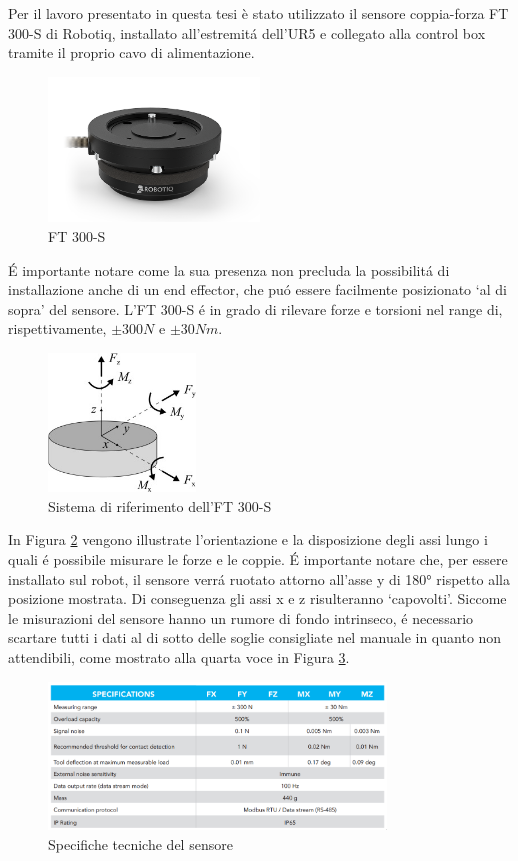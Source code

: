 Per il lavoro presentato in questa tesi è stato utilizzato il sensore coppia-forza FT 300-S di Robotiq, installato all'estremit\'{a} 
dell'UR5 e collegato alla control box tramite il proprio cavo di alimentazione. 
\begin{figure}[H]
    \centering
    \includegraphics*[width=0.5\textwidth]{images/ft.png}
    \caption{FT 300-S}
    \label{fig:ft}
\end{figure}
\'{E} importante notare come la sua presenza non precluda la possibilit\'{a} di installazione anche di un end effector, 
che pu\'{o} essere facilmente posizionato `al di sopra' del sensore. 
L'FT 300-S \'{e} in grado di rilevare forze e torsioni nel range di, rispettivamente, $\pm 300 N$ e $\pm 30 Nm$. 
\begin{figure}[H]
    \centering
    \includegraphics*[width=0.35\textwidth]{images/ft_axes.jpg}
    \caption{Sistema di riferimento dell'FT 300-S}
    \label{fig:ft_axes}
\end{figure}
In Figura \ref{fig:ft_axes} vengono illustrate l'orientazione e la disposizione degli assi lungo i quali \'{e} possibile misurare le 
forze e le coppie. \'{E} importante notare che, per essere installato sul robot, il sensore verr\'{a} ruotato attorno all'asse y di 180° 
rispetto alla posizione mostrata. Di conseguenza gli assi x e z risulteranno `capovolti'.
Siccome le misurazioni del sensore hanno un rumore di fondo intrinseco, \'{e} necessario scartare tutti i dati al di sotto delle 
soglie consigliate nel manuale \cite{ft_sensor} in quanto non attendibili, come mostrato alla quarta voce in Figura \ref{fig:data_sheet}.
\begin{figure}[H]
    \centering
    \includegraphics*[width=0.8\textwidth]{images/data_sheet.png}
    \caption{Specifiche tecniche del sensore}
    \label{fig:data_sheet}
\end{figure}

